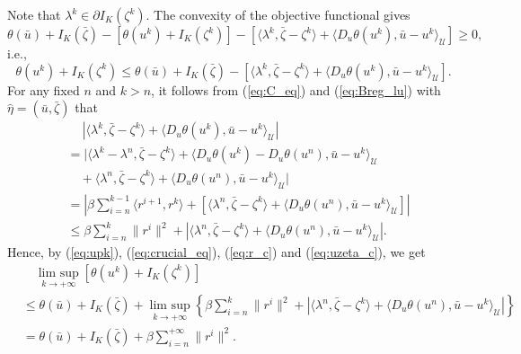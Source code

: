 \documentclass[leqno]{amsart}
\DeclareMathOperator*\uplim{lim\ sup}
\theoremstyle{definition}
\begin{document}
Note that  $\lambda^k\in \partial I_K(\zeta^k)$. The convexity of the objective functional gives
$$ \theta(\bar{u}) + I_K(\bar{\zeta}) - [\theta(u^k) + I_K(\zeta^k)] - [ \langle \lambda^k, \bar{\zeta} - \zeta^k\rangle + \langle D_u\theta(u^k), \bar{u} - u^k \rangle_\mathcal{U}]\geq 0, $$
i.e.,
\begin{equation}\label{eq:upk}
\theta(u^k) + I_K(\zeta^k) \leq \theta(\bar{u}) + I_K(\bar{\zeta}) - [ \langle \lambda^k, \bar{\zeta} - \zeta^k\rangle + \langle D_u\theta(u^k), \bar{u} - u^k \rangle_\mathcal{U}].
\end{equation}
For any fixed $n$  and $k>n$, it follows from (\ref{eq:C_eq}) and (\ref{eq:Breg_lu}) with $\hat{\eta} = (\bar{u}, \bar{\zeta})$ that
\begin{equation}\label{eq:crucial_eq}
\begin{aligned}
&\quad\ |\langle \lambda^k, \bar{\zeta} - \zeta^k\rangle + \langle D_u\theta(u^k), \bar{u} - u^k \rangle_\mathcal{U}|\\
& =  |\langle \lambda^k - \lambda^n, \bar{\zeta} - \zeta^k\rangle + \langle D_u\theta(u^k) - D_u\theta(u^n), \bar{u} - u^k \rangle_\mathcal{U} \\
&\quad + \langle \lambda^n, \bar{\zeta} - \zeta^k\rangle + \langle D_u\theta(u^n), \bar{u} - u^k \rangle_\mathcal{U}|\\
& = | \beta\sum\limits_{i = n}^{k-1}\langle r^{i+1}, r^k\rangle + [\langle \lambda^n, \bar{\zeta} - \zeta^k\rangle + \langle D_u\theta(u^n), \bar{u} - u^k \rangle_\mathcal{U}]|\\
& \leq \beta\sum\limits_{i = n}^{k}\|r^{i}\|^2 + |\langle \lambda^n, \bar{\zeta} - \zeta^k\rangle + \langle D_u\theta(u^n), \bar{u} - u^k \rangle_\mathcal{U}|.
\end{aligned}
\end{equation}
Hence, by (\ref{eq:upk}), (\ref{eq:crucial_eq}), (\ref{eq:r_c}) and (\ref{eq:uzeta_c}), we get
\begin{equation}\nonumber
\begin{aligned}
&\quad \uplim\limits_{k\rightarrow +\infty}[\theta(u^k) + I_K(\zeta^k)]\\ 
& \leq \theta(\bar{u}) + I_K(\bar{\zeta}) + \uplim\limits_{k\rightarrow +\infty}\left\{\beta\sum\limits_{i = n}^{k}\|r^{i}\|^2 + |\langle \lambda^n, \bar{\zeta} - \zeta^k\rangle + \langle D_u\theta(u^n), \bar{u} - u^k \rangle_\mathcal{U}| \right\}\\
& =  \theta(\bar{u}) + I_K(\bar{\zeta}) + \beta\sum\limits_{i = n}^{+\infty}\|r^{i}\|^2.
\end{aligned}
\end{equation}
\end{document}
